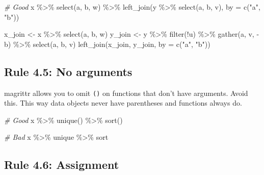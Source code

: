 \documentclass[
  letterpaper,
  DIV=11,
  numbers=noendperiod]{scrreprt}
\newenvironment{Shaded}{\begin{snugshade}}{\end{snugshade}}
\newcommand{\AttributeTok}[1]{\textcolor[rgb]{0.49,0.56,0.16}{#1}}
\newcommand{\CommentTok}[1]{\textcolor[rgb]{0.38,0.63,0.69}{\textit{#1}}}
\newcommand{\FunctionTok}[1]{\textcolor[rgb]{0.02,0.16,0.49}{#1}}
\newcommand{\NormalTok}[1]{\textcolor[rgb]{0.00,0.44,0.13}{#1}}
\newcommand{\OtherTok}[1]{\textcolor[rgb]{0.00,0.44,0.13}{#1}}
\newcommand{\SpecialCharTok}[1]{\textcolor[rgb]{0.25,0.44,0.63}{#1}}
\newcommand{\StringTok}[1]{\textcolor[rgb]{0.25,0.44,0.63}{#1}}
\begin{document}
\begin{Shaded}
\begin{Highlighting}[]
\CommentTok{\# Good}
\NormalTok{x }\SpecialCharTok{\%\textgreater{}\%}
  \FunctionTok{select}\NormalTok{(a, b, w) }\SpecialCharTok{\%\textgreater{}\%}
  \FunctionTok{left\_join}\NormalTok{(y }\SpecialCharTok{\%\textgreater{}\%} \FunctionTok{select}\NormalTok{(a, b, v), }\AttributeTok{by =} \FunctionTok{c}\NormalTok{(}\StringTok{"a"}\NormalTok{, }\StringTok{"b"}\NormalTok{))}

\NormalTok{x\_join }\OtherTok{\textless{}{-}}
\NormalTok{  x }\SpecialCharTok{\%\textgreater{}\%}
  \FunctionTok{select}\NormalTok{(a, b, w)}
\NormalTok{y\_join }\OtherTok{\textless{}{-}}
\NormalTok{  y }\SpecialCharTok{\%\textgreater{}\%}
  \FunctionTok{filter}\NormalTok{(}\SpecialCharTok{!}\NormalTok{u) }\SpecialCharTok{\%\textgreater{}\%}
  \FunctionTok{gather}\NormalTok{(a, v, }\SpecialCharTok{{-}}\NormalTok{b) }\SpecialCharTok{\%\textgreater{}\%}
  \FunctionTok{select}\NormalTok{(a, b, v)}
\FunctionTok{left\_join}\NormalTok{(x\_join, y\_join, }\AttributeTok{by =} \FunctionTok{c}\NormalTok{(}\StringTok{"a"}\NormalTok{, }\StringTok{"b"}\NormalTok{))}
\end{Highlighting}
\end{Shaded}

\hypertarget{rule-4.5-no-arguments}{%
\subsection{Rule 4.5: No arguments}\label{rule-4.5-no-arguments}}

magrittr allows you to omit \texttt{()} on functions that don't have
arguments. Avoid this. This way data objects never have parentheses and
functions always do.

\begin{Shaded}
\begin{Highlighting}[]
\CommentTok{\# Good}
\NormalTok{x }\SpecialCharTok{\%\textgreater{}\%}
  \FunctionTok{unique}\NormalTok{() }\SpecialCharTok{\%\textgreater{}\%}
  \FunctionTok{sort}\NormalTok{()}

\CommentTok{\# Bad}
\NormalTok{x }\SpecialCharTok{\%\textgreater{}\%}
\NormalTok{  unique }\SpecialCharTok{\%\textgreater{}\%}
\NormalTok{  sort}
\end{Highlighting}
\end{Shaded}

\hypertarget{rule-4.6-assignment}{%
\subsection{Rule 4.6: Assignment}\label{rule-4.6-assignment}}
\end{document}
